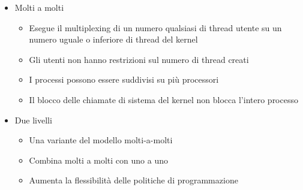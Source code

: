 \documentclass{article}
\begin{document}
\begin{itemize}
    \item Molti a molti 
        \begin{itemize}
            \item Esegue il multiplexing di un numero qualsiasi di thread utente su un numero uguale o inferiore di thread del kernel
            \item Gli utenti non hanno restrizioni sul numero di thread creati
            \item I processi possono essere suddivisi su più processori
            \item Il blocco delle chiamate di sistema del kernel non blocca l'intero processo
        \end{itemize}
    \item Due livelli
        \begin{itemize}
            \item Una variante del modello molti-a-molti
            \item Combina molti a molti con uno a uno
            \item Aumenta la flessibilità delle politiche di programmazione
        \end{itemize}
\end{itemize}

\pagebreak
\end{document}

